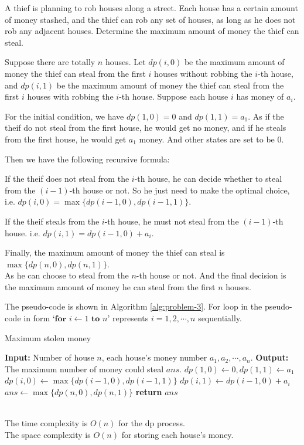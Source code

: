 \problem{}
A thief is planning to rob houses along a street. Each house has a certain amount of money stashed, and the thief can rob any set of houses, as long as he does not rob any adjacent houses.  Determine the maximum amount of money the thief can steal.
\solution{}

Suppose there are totally $n$ houses. Let $dp(i,0)$ be the maximum amount of money the thief can steal from the first $i$ houses without robbing the $i$-th house, and $dp(i,1)$ be the maximum amount of money the thief can steal from the first $i$ houses with robbing the $i$-th house.
Suppose each house $i$ has money of $a_i$.

For the initial condition, we have $dp(1,0)=0$ and $dp(1,1)=a_1$. As if the theif do not steal from the first house, he would get no money, and if he steals from the first house, he would get $a_1$ money.
And other states are set to be $0$. 

Then we have the following recursive formula:

If the theif does not steal from the $i$-th house, he can decide whether to steal from the $(i-1)$-th house or not. So he just need to make the optimal choice,
i.e. $dp(i,0)=\max\{dp(i-1,0),dp(i-1,1)\}$.

If the theif steals from the $i$-th house, he must not steal from the $(i-1)$-th house. i.e. $dp(i,1)=dp(i-1,0)+a_i$.

Finally, the maximum amount of money the thief can steal is $\max\{dp(n,0),dp(n,1)\}$.\\
As he can choose to steal from the $n$-th house or not. And the final decision is the maximum amount of money he can steal from the first $n$ houses.

The pseudo-code is shown in Algorithm \ref{alg:problem-3}. For loop in the pseudo-code in form `$\textbf{for } i \gets 1 \textbf{ to } n$' represents $i=1,2,\cdots,n$ sequentially.
\begin{algorithm}
    \caption{Maximum stolen money}
    \begin{algorithmic}[1]
    \State \textbf{Input:} Number of house $n$, each house's money number $a_1, a_2, \cdots, a_n$. 
    \State \textbf{Output:} The maximum number of money could steal $ans$.
    \State $dp(1,0) \gets 0, dp(1,1)\gets a_1$
        \State $dp(i,0) \gets \max\{dp(i-1,0),dp(i-1,1)\}$
        \State $dp(i,1) \gets dp(i-1,0)+a_i$
    \EndFor
    \State $ans \gets \max\{dp(n,0),dp(n,1)\}$
    \State \textbf{return} $ans$
    \end{algorithmic}
    \label{alg:problem-3}
\end{algorithm}\\
The time complexity is $O(n)$ for the dp process.\\
The space complexity is $O(n)$ for storing each house's money.

\newpage